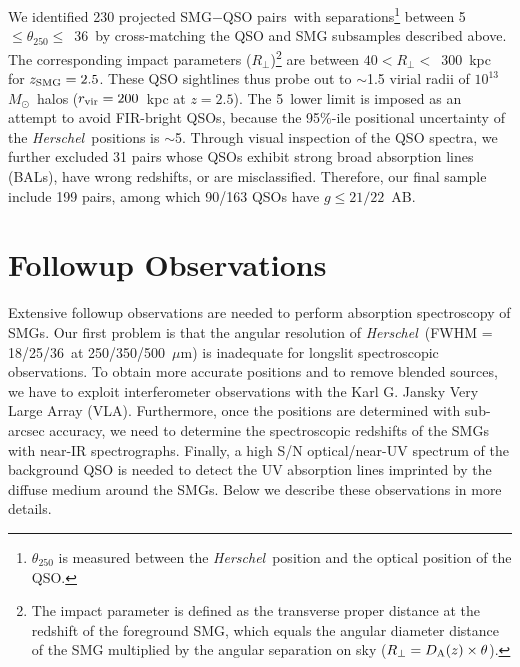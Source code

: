 \documentclass[iop,revtex4,twocolumn,apj,numberedappendix,appendixfloats]{emulateapj}
\newcommand{\hers}{{\it Herschel}}
\newcommand{\msun}{$M_{\odot}$}
\newcommand{\um}{$\mu$m}
\newcommand{\sqps}{SMG$-$QSO pairs}
\begin{document}
We identified 230 projected \sqps\ with separations\footnote{$\theta_{250}$ is measured between the \hers\ position and the optical position of the QSO.} between 5\arcsec~$\leq \theta_{250} \leq$~36\arcsec\ by cross-matching the QSO and SMG subsamples described above. The corresponding impact parameters ($R_\bot$)\footnote{The impact parameter is defined as the transverse proper distance at the redshift of the foreground SMG, which equals the angular diameter distance of the SMG multiplied by the angular separation on sky ($R_\bot = D_{\rm A}(z) \times \theta$).} are between $40 < R_\bot <$~300~kpc for $z_{\rm SMG} = 2.5$. These QSO sightlines thus probe out to $\sim$1.5 virial radii of $10^{13}$~\msun\ halos ($r_{\rm vir} = 200$~kpc at $z = 2.5$). The 5\arcsec\ lower limit is imposed as an attempt to avoid FIR-bright QSOs, because the 95\%-ile positional uncertainty of the \hers\ positions is $\sim$5\arcsec. Through visual inspection of the QSO spectra, we further excluded 31 pairs whose QSOs exhibit strong broad absorption lines (BALs), have wrong redshifts, or are misclassified. Therefore, our final sample include 199 pairs, among which 90/163 QSOs have $g \leq 21/22$~AB.

\begin{figure*}[!tb]
\caption{VLA 6~GHz continuum maps for the six VLA-identified SMGs. Each image is 30\arcsec$\times$30\arcsec\ centered on the \hers\ position. The restoring beam of each map is plotted as the red ellipse at the lower right corner. The white cross and the dashed white circle indicate the \hers\ positions and the 18\arcsec\ FWHM of the 250~\um\ PSF. The green square highlights the detected radio source within the \hers\ FWHM. The white diamond marks the optical position of the QSO, if it is within the displayed region. The gray dotted contour is at $-$2$\times$$\sigma$, and the black contours are at ($+$2, $+$4, $+$8)$\times$$\sigma$. Major tickmarks are spaced in 5\arcsec\ intervals. N is up and E is left for all panels.
\label{fig:detections}} 
\end{figure*}

\section{Followup Observations} \label{sec:obs}

Extensive followup observations are needed to perform absorption spectroscopy of SMGs. Our first problem is that the angular resolution of \hers\ (FWHM = 18\arcsec/25\arcsec/36\arcsec\ at 250/350/500~\um) is inadequate for longslit spectroscopic observations. To obtain more accurate positions and to remove blended sources, we have to exploit interferometer observations with the Karl G. Jansky Very Large Array (VLA). Furthermore, once the positions are determined with sub-arcsec accuracy, we need to determine the spectroscopic redshifts of the SMGs with near-IR spectrographs. Finally, a high S/N optical/near-UV spectrum of the background QSO is needed to detect the UV absorption lines imprinted by the diffuse medium around the SMGs. Below we describe these observations in more details.
\end{document}
